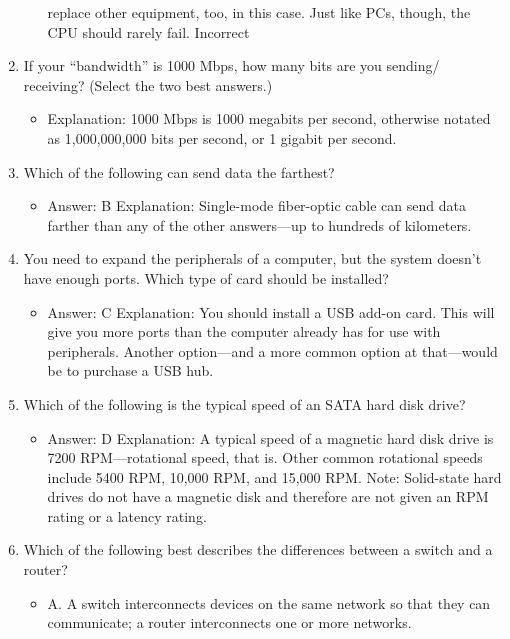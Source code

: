 \documentclass{article}
\begin{document}
\begin{enumerate}
\begin{itemize}
replace other equipment, too, in this case. Just like PCs, though, the CPU should rarely
fail.
Incorrect
    \end{itemize}
    \item If your “bandwidth” is 1000 Mbps, how many bits are you sending/
receiving? (Select the two best answers.)
    \begin{itemize}
        \item Explanation: 1000 Mbps is 1000 megabits per second, otherwise notated as
1,000,000,000 bits per second, or 1 gigabit per second.
    \end{itemize}
    \item Which of the following can send data the farthest?
    \begin{itemize}
        \item Answer: B
Explanation: Single-mode fiber-optic cable can send data farther than any of the other
answers—up to hundreds of kilometers.
    \end{itemize}
    \item You need to expand the peripherals of a computer, but the system
doesn’t have enough ports. Which type of card should be
installed?
    \begin{itemize}
        \item Answer: C
Explanation: You should install a USB add-on card. This will give you more ports than
the computer already has for use with peripherals. Another option—and a more common
option at that—would be to purchase a USB hub.
    \end{itemize}
    \item Which of the following is the typical speed of an SATA hard disk
drive?
    \begin{itemize}
        \item Answer: D
Explanation: A typical speed of a magnetic hard disk drive is 7200 RPM—rotational
speed, that is. Other common rotational speeds include 5400 RPM, 10,000 RPM, and
15,000 RPM. Note: Solid-state hard drives do not have a magnetic disk and therefore
are not given an RPM rating or a latency rating.
    \end{itemize}
    \item Which of the following best describes the differences between a
switch and a router?
    \begin{itemize}
        \item A. A switch interconnects devices on the same network
so that they can communicate; a router interconnects
one or more networks.
    \end{itemize}

\end{enumerate}
\end{document}
